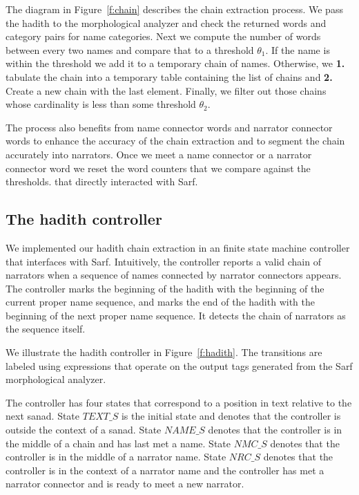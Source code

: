 \documentclass[11pt]{article}
\begin{document}
The diagram in Figure~\ref{f:chain} describes 
the chain extraction process. 
We pass the hadith to the morphological analyzer 
and check the returned words and category pairs 
for name categories.
Next we compute the number of words between every two names
and compare that to a threshold $\theta_1$.
If the name is within the threshold we add it to a temporary 
chain of names. 
Otherwise, we 
{\bf 1.} tabulate the chain into a temporary table containing 
the list of chains and
{\bf 2.} Create a new chain with the last element.
Finally, we filter out those chains whose cardinality 
is less than some threshold  $\theta_2$.

The process also benefits from name connector 
words and narrator connector words to enhance the
accuracy of the chain extraction and to segment the 
chain accurately into narrators.
Once we meet a name connector or a narrator 
connector word we reset the word counters that we
compare against the thresholds. 
that directly interacted with Sarf.



\subsection{The hadith controller}
\label{sec:controller}

We implemented our hadith chain extraction 
in an finite state machine
controller that interfaces with Sarf.
Intuitively, the controller reports a valid chain 
of narrators when a sequence of names
connected by narrator connectors appears. 
The controller marks the beginning of the hadith with 
the beginning of 
the current proper name sequence,
and marks the end of the hadith with the beginning of the 
next proper name sequence. 
It detects the chain of narrators as the sequence itself. 

We illustrate the hadith controller 
in Figure~\ref{f:hadith}. 
The transitions are labeled using expressions
that operate on the output tags 
generated from the Sarf morphological analyzer.

The controller has four states that correspond to 
a position in text relative to the next sanad. 
State $\mathit{TEXT\_S}$ is the initial state and denotes 
that the controller is outside the context of a sanad.
State $\mathit{NAME\_S}$ denotes that the controller is in
the middle of a chain and has last met a name. 
State $\mathit{NMC\_S}$ denotes that the controller is in
the middle of a narrator name.
State $\mathit{NRC\_S}$ denotes that the controller is 
in the context of a narrator name and the controller 
has met a narrator connector and is ready to meet 
a new narrator. 
\end{document}
